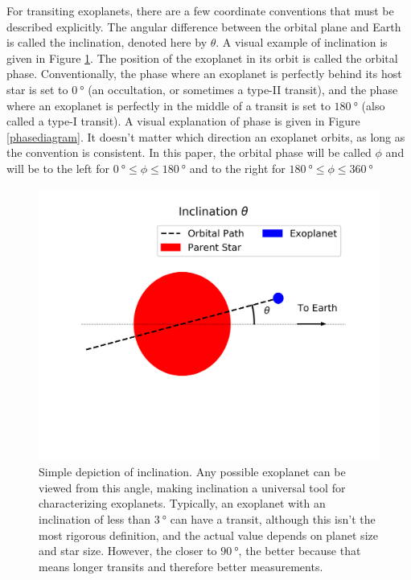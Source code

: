 For transiting exoplanets, there are a few coordinate conventions that must be
 described explicitly. The angular difference between the
 orbital plane and Earth is called the inclination, denoted here by $\theta$. A
 visual example of inclination is given in Figure \ref{inclinationdiagram}.
 The position of the exoplanet in its orbit is called the orbital phase.
 Conventionally, the phase where an exoplanet is perfectly behind
 its host star is set to $\SI{0}{\degree}$ (an occultation, or sometimes a type-II
 transit), and the phase where an exoplanet is perfectly in the middle of a
 transit is set to $\SI{180}{\degree}$ (also called a type-I transit). A visual
 explanation of phase is given in Figure \ref{phasediagram}. It
 doesn't matter which direction an exoplanet orbits, as long as the
 convention is consistent. In this paper, the orbital phase will be called
 $\phi$ and will be to the left for $\SI{0}{\degree}\leq\phi\leq\SI{180}{\degree}$
 and to the right for $\SI{180}{\degree}\leq\phi\leq\SI{360}{\degree}$

\begin{figure}[ht]
    \centering
    \includegraphics[width=5in]{background/inclination_diagram.png}
    \caption[Definition of Inclination]{Simple depiction of inclination. Any
    possible exoplanet can be viewed from this angle, making inclination a
    universal tool for characterizing exoplanets. Typically, an exoplanet with
    an inclination of less than $\SI{3}{\degree}$ can have a transit, although
    this isn't the most rigorous definition, and the actual value depends on
    planet size and star size. However, the closer to $\SI{90}{\degree}$, the
    better because that means longer transits and therefore better
    measurements.}
    \label{inclinationdiagram}
\end{figure}

